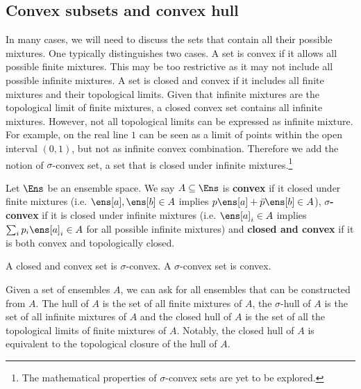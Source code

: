 
\subsection{Convex subsets and convex hull}

In many cases, we will need to discuss the sets that contain all their possible mixtures. One typically distinguishes two cases. A set is convex if it allows all possible finite mixtures. This may be too restrictive as it may not include all possible infinite mixtures. A set is closed and convex if it includes all finite mixtures and their topological limits. Given that infinite mixtures are the topological limit of finite mixtures, a closed convex set contains all infinite mixtures. However, not all topological limits can be expressed as infinite mixture. For example, on the real line $1$ can be seen as a limit of points within the open interval $(0,1)$, but not as infinite convex combination. Therefore we add the notion of $\sigma$-convex set, a set that is closed under infinite mixtures.\footnote{The mathematical properties of $\sigma$-convex sets are yet to be explored.}

\begin{mathSection}
\begin{defn}
	Let $\Ens$ be an ensemble space. We say $A \subseteq \Ens$ is \textbf{convex} if it closed under finite mixtures (i.e. $\ens[a],\ens[b] \in A$ implies $p\ens[a] + \bar{p} \ens[b] \in A$), \textbf{$\sigma$-convex} if it is closed under infinite mixtures (i.e. $\ens[a]_i \in A$ implies $\sum_i p_i \ens[a]_i \in A$ for all possible infinite mixtures) and \textbf{closed and convex} if it is both convex and topologically closed.
\end{defn}

\begin{coro}
	A closed and convex set is $\sigma$-convex. A $\sigma$-convex set is convex.
\end{coro}
\end{mathSection}

Given a set of ensembles $A$, we can ask for all ensembles that can be constructed from $A$. The hull of $A$ is the set of all finite mixtures of $A$, the $\sigma$-hull of $A$ is the set of all infinite mixtures of $A$ and the closed hull of $A$ is the set of all the topological limits of finite mixtures of $A$. Notably, the closed hull of $A$ is equivalent to the topological closure of the hull of $A$.

